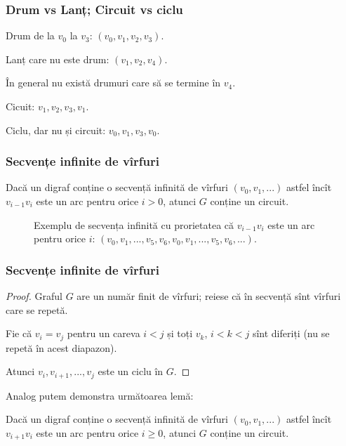 \begin{frame}
  \frametitle{Drum vs Lanț; Circuit vs ciclu}

\begin{figure}
\centering%
%
\end{figure}

Drum de la $v_0$ la $v_3$: $(v_0,v_1,v_2,v_3)$.

Lanț care nu este drum: $(v_1,v_2,v_4)$.

În general nu există drumuri care să se termine în $v_4$.

Cicuit: $v_1,v_2,v_3,v_1$.

Ciclu, dar nu și circuit: $v_0,v_1,v_3,v_0$.

\end{frame}

\begin{frame}
  \frametitle{Secvențe infinite de vîrfuri}

\begin{lemma}
Dacă un digraf conține o secvență infinită de vîrfuri $(v_0,v_1,...)$ astfel încît $v_{i-1}v_i$ este un arc pentru orice $i>0$, atunci $G$ conține un circuit.
\end{lemma}

\begin{figure}
\centering%
%
\caption{Exemplu de secvența infinită cu prorietatea că $v_{i-1}v_i$ este un arc pentru orice $i$: $(v_0,v_1,...,v_5,v_6,v_0,v_1,...,v_5,v_6,...)$.}
\end{figure}

\end{frame}


\begin{frame}
  \frametitle{Secvențe infinite de vîrfuri}

\begin{proof}
Graful $G$ are un număr finit de vîrfuri; reiese că în secvență sînt vîrfuri care se repetă.

Fie că $v_i=v_j$ pentru un careva $i<j$  și toți $v_k$, $i<k<j$ sînt diferiți (nu se repetă în acest diapazon).

Atunci $v_i,v_{i+1},...,v_j$ este un ciclu în $G$.
\end{proof}

Analog putem demonstra următoarea lemă:

\begin{lemma}
Dacă un digraf conține o secvență infinită de vîrfuri $(v_0,v_1,...)$ astfel încît $v_{i+1}v_i$ este un arc pentru orice $i\geq 0$, atunci $G$ conține un circuit.
\end{lemma}

\end{frame}

